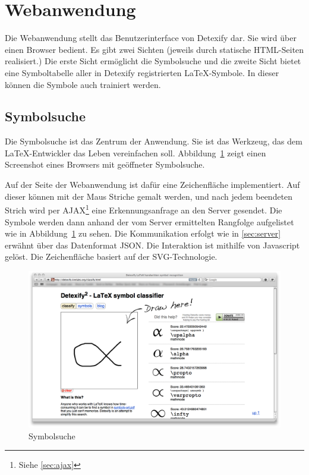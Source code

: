 

\section{Webanwendung} %
\label{sec:webanwendung}


Die Webanwendung stellt das Benutzerinterface von Detexify dar. Sie wird über einen Browser bedient. Es gibt zwei Sichten (jeweils durch statische \ac{HTML}-Seiten realisiert.) Die erste Sicht ermöglicht die Symbolsuche und die zweite Sicht bietet eine Symboltabelle aller in Detexify registrierten \LaTeX-Symbole. In dieser können die Symbole auch trainiert werden.

\subsection{Symbolsuche} %
\label{sub:symbolsuche}

Die Symbolsuche ist das Zentrum der Anwendung. Sie ist das Werkzeug, das dem \LaTeX-Entwickler das Leben vereinfachen soll. Abbildung~\ref{fig:symbolsuche} zeigt einen Screenshot eines Browsers mit geöffneter Symbolsuche.

Auf der Seite der Webanwendung ist dafür eine Zeichenfläche implementiert. Auf dieser können mit der Maus Striche gemalt werden, und nach jedem beendeten Strich wird per AJAX\footnote{Siehe \ref{sec:ajax}} eine Erkennungsanfrage an den Server gesendet. Die Symbole werden dann anhand der vom Server ermittelten Rangfolge aufgelistet wie in Abbildung~\ref{fig:symbolsuche} zu sehen. Die Kommunikation erfolgt wie in \ref{sec:server} erwähnt über das Datenformat \ac{JSON}. Die Interaktion ist mithilfe von Javascript gelöst. Die Zeichenfläche basiert auf der \ac{SVG}-Technologie.

\begin{figure}
  \centering \includegraphics[width=\textwidth]{figures/interface-classify.png}
  \caption{Symbolsuche}
  \label{fig:symbolsuche}
\end{figure}

